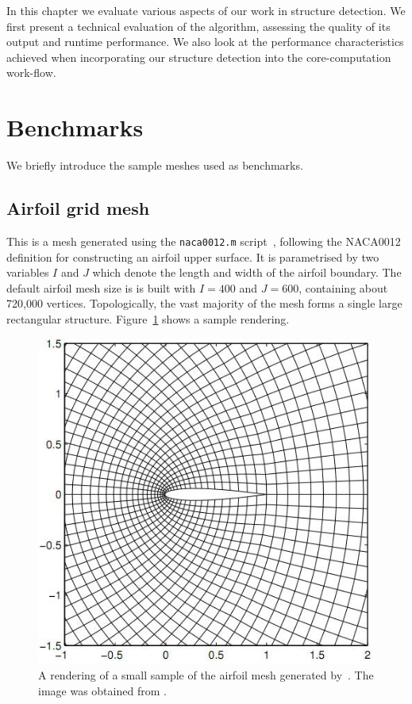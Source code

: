 \label{chap:evaluation}

In this chapter we evaluate various aspects of our work in structure detection.
We first present a technical evaluation of the algorithm, assessing the quality of its output and runtime performance. We also look at the performance characteristics achieved when incorporating our structure detection into the core-computation work-flow.


\section{Benchmarks}
We briefly introduce the sample meshes used as benchmarks.

\subsection{Airfoil grid mesh}
This is a mesh generated using the \texttt{naca0012.m} script~\cite{airfoilgen}, following the NACA0012 definition for constructing an airfoil upper surface. It is parametrised by two variables $I$ and $J$ which denote the length and width of the airfoil boundary. The default airfoil mesh size is is built with $I=400$ and $J=600$, containing about 720,000 vertices. Topologically, the vast majority of the mesh forms a single large rectangular structure. Figure~\ref{fig:airfoil-mesh} shows a sample rendering.

\begin{figure}
\includegraphics[width=\textwidth]{images/evaluation/airfoil.jpeg}
\caption{A rendering of a small sample of the airfoil mesh generated by~\cite{airfoilgen}. The image was obtained from \cite{Tkachov2012thesis}.}
\label{fig:airfoil-mesh}
\end{figure}

